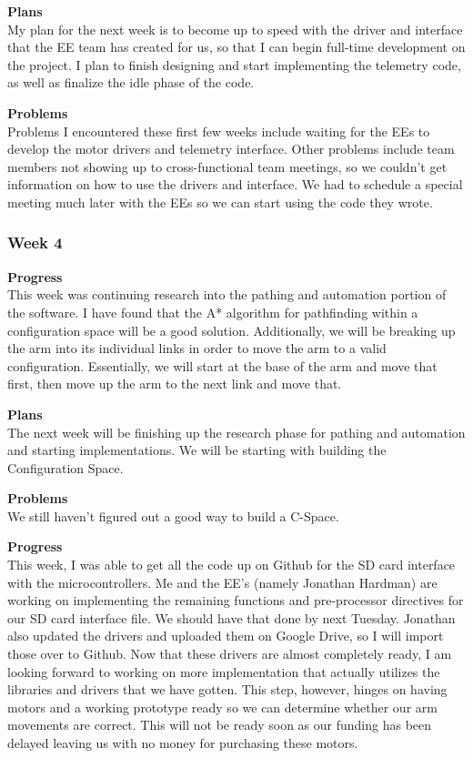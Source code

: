 \textbf{Plans} \\
My plan for the next week is to become up to speed with the driver and 
interface that the EE team has created for us, so that I can begin full-time 
development on the project. I plan to finish designing and start implementing 
the telemetry code, as well as finalize the idle phase of the code.

\textbf{Problems} \\
Problems I encountered these first few weeks include waiting for the EEs to 
develop the motor drivers and telemetry interface. Other problems include team
members not showing up to cross-functional team meetings, so we couldn't get 
information on how to use the drivers and interface. We had to schedule a 
special meeting much later with the EEs so we can start using the code they 
wrote.

\subsubsection{Week 4}
\textbf{Progress} \\ 
This week was continuing research into the pathing and automation portion of the software. I have found that the A* algorithm for pathfinding within a configuration space will be a good solution. Additionally, we will be breaking up the arm into its individual links in order to move the arm to a valid configuration. Essentially, we will start at the base of the arm and move that first, then move up the arm to the next link and move that.

\textbf{Plans} \\ 
The next week will be finishing up the research phase for pathing and automation and starting implementations. We will be starting with building the Configuration Space.

\textbf{Problems} \\ 
We still haven't figured out a good way to build a C-Space.

\textbf{Progress} \\ 
This week, I was able to get all the code up on Github for the SD card interface with the microcontrollers. Me and 
the EE's (namely Jonathan Hardman) are working on implementing the remaining functions and pre-processor directives 
for our SD card interface file. We should have that done by next Tuesday. Jonathan also updated the drivers and 
uploaded 
them on Google Drive, so I will import those over to Github. Now that these drivers are almost completely ready, I am 
looking forward to working on more implementation that actually utilizes the libraries and drivers that we have 
gotten. This step, however, hinges on having motors and a working prototype ready so we can determine whether our
arm movements are correct. This will not be ready soon as our funding has been delayed leaving us with no money for 
purchasing these motors.

